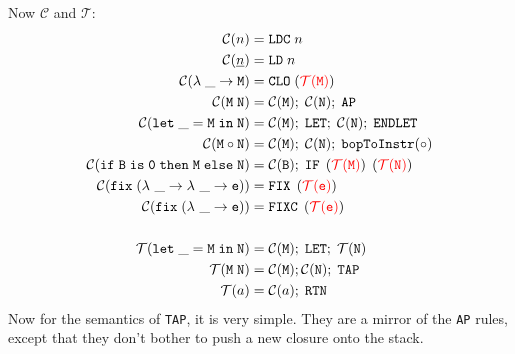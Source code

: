 Now $\mathcal{C}$ and $\mathcal{T}$:
\[
\begin{aligned}
    \mathcal{C}(n) &= \mathtt{LDC}\; n \\
    \mathcal{C}(\underline{n}) &= \mathtt{LD}\; n \\
    \mathcal{C}(\mathtt{\lambda\; \_ \to M}) &= \mathtt{CLO}\; (\textcolor{red}{\mathcal{T}(\mathtt{M})}) \\
    \mathcal{C}(\mathtt{M\; N}) &= \mathcal{C}(\mathtt{M});\; \mathcal{C}(\mathtt{N});\; \mathtt{AP} \\
    \mathcal{C}(\mathtt{let\; \_ = M\; in\; N}) & = \mathcal{C}(\mathtt{M});\; \texttt{LET};\; \mathcal{C}(\mathtt{N});\; \texttt{ENDLET} \\
    \mathcal{C}(\mathtt{M \circ N}) &= \mathcal{C}(\mathtt{M});\; \mathcal{C}(\mathtt{N});\; \mathtt{bopToInstr}(\circ) \\
    \mathcal{C}(\mathtt{if\; B\; is\; 0\; then \; M\; else \; N}) &= \mathcal{C}(\mathtt{B});\; \mathtt{IF}\; \left(\textcolor{red}{\mathcal{T}(\mathtt{M})}\right)\; \left(\textcolor{red}{\mathcal{T}(\mathtt{N})}\right) \\
    \mathcal{C}(\mathtt{fix\; (\lambda \ \_ \to \lambda \ \_ \to e)}) &= \mathtt{FIX}\; \left(\textcolor{red}{\mathcal{T}(\mathtt{e})}\right) \\
    \mathcal{C}(\mathtt{fix\; (\lambda \ \_ \to e)}) &= \mathtt{FIXC}\; \left(\textcolor{red}{\mathcal{T}(\mathtt{e})}\right) \\
    \\
    \mathcal{T}(\mathtt{let\; \_ = M\; in\; N}) & = \mathcal{C}(\mathtt{M});\; \texttt{LET};\; \mathcal{T}(\mathtt{N}) \\
    \mathcal{T}(\mathtt{M\; N}) &= \mathcal{C}(\mathtt{M}); \mathcal{C}(\mathtt{N});\; \mathtt{TAP} \\
    \mathcal{T}(a) &= \mathcal{C}(a);\; \texttt{RTN}
\end{aligned}
\]
Now for the semantics of \texttt{TAP}, it is very simple. They are a mirror of the \texttt{AP} rules, except that they don't bother
to push a new closure onto the stack.

